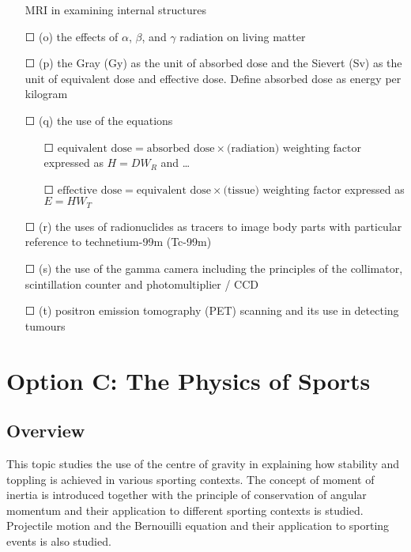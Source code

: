 \begin{itemize}
	MRI in examining internal structures
	\item[\Large{$\Square$}](o) the effects of \(\alpha\), \(\beta\), and \(\gamma\) radiation on living matter
	\item[\Large{$\Square$}](p) the Gray (Gy) as the unit of absorbed dose and the Sievert (Sv) as the unit of equivalent dose and effective dose. Define absorbed dose as energy per kilogram
	\item[\Large{$\Square$}](q) the use of the equations 
	\begin{itemize}
		\item[\Large{$\Square$}]\(\text{equivalent dose} = \text{absorbed dose} \times \text{(radiation) weighting factor}\) expressed as \(H=DW_{R}\) and \ldots
		\item[\Large{$\Square$}]\(\text{effective dose} = \text{equivalent dose} \times \text{(tissue) weighting factor}\) expressed as \(E=HW_{T}\)
	\end{itemize}
	\item[\Large{$\Square$}](r) the uses of radionuclides as tracers to image body parts with particular
	reference to technetium-99m (Tc-99m)
	\item[\Large{$\Square$}](s) the use of the gamma camera including the principles of the collimator,
	scintillation counter and photomultiplier / CCD
	\item[\Large{$\Square$}](t) positron emission tomography (PET) scanning and its use in detecting
	tumours
\end{itemize}
\newpage
\section*{Option C: The Physics of Sports}
\subsection*{Overview}
This topic studies the use of the centre of gravity in explaining how stability and
toppling is achieved in various sporting contexts. The concept of moment of inertia is
introduced together with the principle of conservation of angular momentum and their
application to different sporting contexts is studied. Projectile motion and the
Bernouilli equation and their application to sporting events is also studied.
